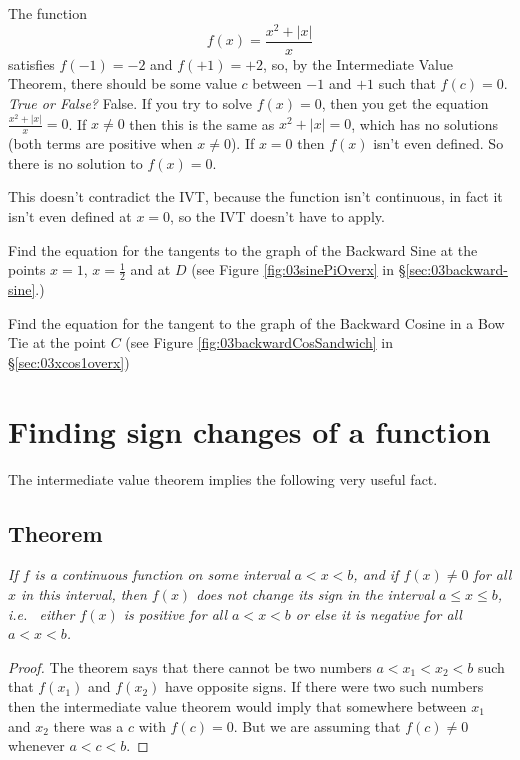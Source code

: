 \begin{multicols}{2}
\problem \groupproblem The function $$f(x) = \frac{x^2+|x|}{x}$$ satisfies $f(-1) =
-2$ and $f(+1) = +2$, so, by the Intermediate Value Theorem,
there should be some value $c$ between $-1$ and $+1$ such that
$f(c) = 0$.  \emph{True or False?}
\answer
False.  If you try to solve $f(x) = 0$, then you get the equation 
$\frac{x^2+|x|}{x}=0$.  If $x\ne0$ then this is the same as
$x^2+|x|=0$, which has no solutions (both terms are positive when
$x\ne0$).  If $x=0$ then $f(x)$ isn't even defined.
So there is no solution to $f(x) = 0$.

This doesn't contradict the IVT, because the function isn't
continuous, in fact it isn't even defined at $x=0$, so the IVT
doesn't have to apply.  
\endanswer


\problem Find the equation for the tangents to the graph of the Backward Sine
at the points $x=1$, $x=\frac12$ and at $D$  (see Figure
\ref{fig:03sinePiOverx} in \S\ref{sec:03backward-sine}.)

\problem Find the equation for the tangent to the graph of the Backward Cosine
in a Bow Tie at the point $C$  (see Figure
\ref{fig:03backwardCosSandwich} in \S\ref{sec:03xcos1overx})
\end{multicols}

\noproblemfont

\section{Finding sign changes of a function}
The intermediate value theorem implies the following very useful fact.

\subsection{Theorem}
\label{thm:nosignchangebetweenzeros}\itshape
If $f$ is a continuous function on some interval $a<x<b$, and if
$f(x)\neq0$ for all $x$ in this interval, then $f(x)$ does not change
its sign in the interval $a\leq x\leq b$, i.e.~ either $f(x)$ is
positive for all $a<x<b$ or else it is negative for all $a<x<b$.
\upshape

\begin{proof}
  The theorem says that there cannot be two numbers $a<x_1<x_2<b$ such
  that $f(x_1)$ and $f(x_2)$ have opposite signs.  If there were two
  such numbers then the intermediate value theorem would imply that
  somewhere between $x_1$ and $x_2$ there was a $c$ with $f(c)=0$.
  But we are assuming that $f(c)\neq0$ whenever $a<c<b$.
\end{proof}

